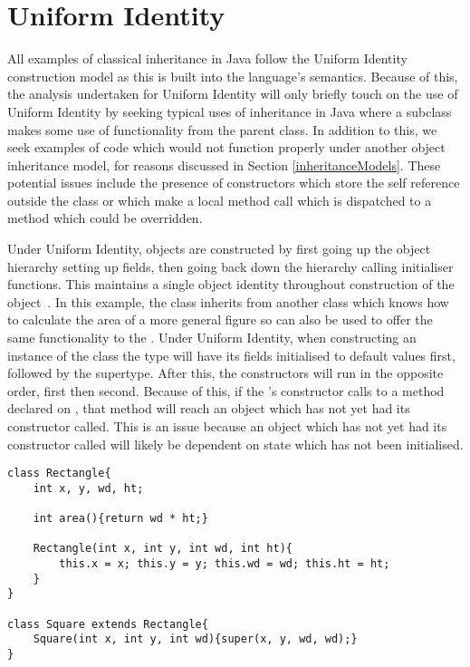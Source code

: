 \section{Uniform Identity}
\label{sec:uniformIdentity}
All examples of classical inheritance in Java follow the Uniform Identity construction model as this is built into the language's semantics. Because of this, the analysis undertaken for Uniform Identity will only briefly touch on the use of Uniform Identity by seeking typical uses of inheritance in Java where a subclass makes some use of functionality from the parent class. In addition to this, we seek examples of code which would not function properly under another object inheritance model, for reasons discussed in Section \ref{inheritanceModels}. These potential issues include the presence of constructors which store the self reference outside the class or which make a local method call which is dispatched to a method which could be overridden.

Under Uniform Identity, objects are constructed by first going up the object hierarchy setting up fields, then going back down the hierarchy calling initialiser functions. This maintains a single object identity throughout construction of the object~\cite{InheritanceWithoutClasses}. In this example, the  class inherits from another class which knows how to calculate the area of a more general figure so can also be used to offer the same functionality to the . Under Uniform Identity, when constructing an instance of the  class the  type will have its fields initialised to default values first, followed by the  supertype. After this, the constructors will run in the opposite order,  first then  second. Because of this, if the 's constructor calls to a method declared on , that method will reach an object which has not yet had its constructor called. This is an issue because an object which has not yet had its constructor called will likely be dependent on state which has not been initialised.
\begin{lstlisting}
class Rectangle{
	int x, y, wd, ht;

	int area(){return wd * ht;}

	Rectangle(int x, int y, int wd, int ht){
		this.x = x; this.y = y; this.wd = wd; this.ht = ht;
	}
}

class Square extends Rectangle{
	Square(int x, int y, int wd){super(x, y, wd, wd);}
}
\end{lstlisting}

